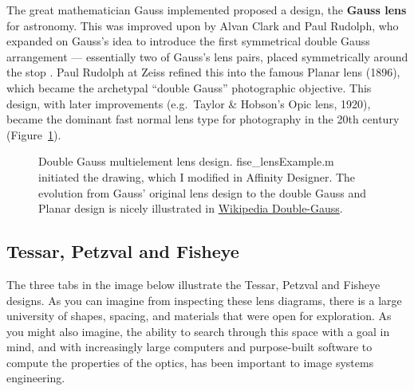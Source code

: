 \documentclass[
  letterpaper,
]{book}
\begin{document}
The great mathematician Gauss implemented proposed a design, the
\textbf{Gauss lens} for astronomy. This was improved upon by Alvan Clark
and Paul Rudolph, who expanded on Gauss's idea to introduce the first
symmetrical double Gauss arrangement --- essentially two of Gauss's lens
pairs, placed symmetrically around the stop . Paul Rudolph at Zeiss
refined this into the famous Planar lens (1896), which became the
archetypal ``double Gauss'' photographic objective. This design, with
later improvements (e.g.~Taylor \& Hobson's Opic lens, 1920), became the
dominant fast normal lens type for photography in the 20th century
(Figure~\ref{fig-double-gauss}).

\begin{figure}


\caption{\label{fig-double-gauss}Double Gauss multielement lens design.
fise\_lensExample.m initiated the drawing, which I modified in Affinity
Designer. The evolution from Gauss' original lens design to the double
Gauss and Planar design is nicely illustrated in
\href{https://en.wikipedia.org/wiki/Double-Gauss_lens}{Wikipedia
Double-Gauss}.}

\end{figure}%

\subsection{Tessar, Petzval and Fisheye}\label{sec-optics-famous-lenses}

The three tabs in the image below illustrate the Tessar, Petzval and
Fisheye designs. As you can imagine from inspecting these lens diagrams,
there is a large university of shapes, spacing, and materials that were
open for exploration. As you might also imagine, the ability to search
through this space with a goal in mind, and with increasingly large
computers and purpose-built software to compute the properties of the
optics, has been important to image systems engineering.
\end{document}
